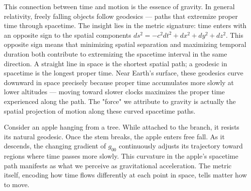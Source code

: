 This connection between time and motion is the essence of gravity. In general relativity, freely falling objects follow geodesics — paths that extremize proper time through spacetime. The insight lies in the metric signature: time enters with an opposite sign to the spatial components \( ds^2 = -c^2 dt^2 + dx^2 + dy^2 + dz^2 \). This opposite sign means that minimizing spatial separation and maximizing temporal duration both contribute to extremizing the spacetime interval in the same direction. A straight line in space is the shortest spatial path; a geodesic in spacetime is the longest proper time. Near Earth's surface, these geodesics curve downward in space precisely because proper time accumulates more slowly at lower altitudes — moving toward slower clocks maximizes the proper time experienced along the path. The "force" we attribute to gravity is actually the spatial projection of motion along these curved spacetime paths.

Consider an apple hanging from a tree. While attached to the branch, it resists its natural geodesic. Once the stem breaks, the apple enters free fall. As it descends, the changing gradient of \( g_{00} \) continuously adjusts its trajectory toward regions where time passes more slowly. This curvature in the apple's spacetime path manifests as what we perceive as gravitational acceleration. The metric itself, encoding how time flows differently at each point in space, tells matter how to move.


\newpage

